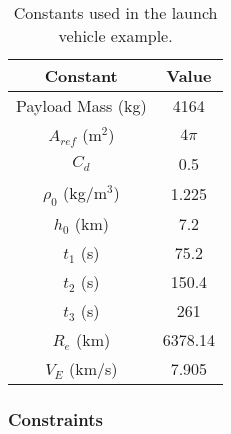 \documentclass[10pt]{article}
\begin{document}
\begin{table}[htdp]
\caption{Constants used in the launch vehicle example.}
\begin{center}
\begin{tabular}{|c|c|}
\hline
Constant & Value \\
\hline \hline
Payload Mass (kg) & 4164 \\
\hline
$A_{ref}$ (m${}^2$) & $4\pi$ \\
\hline
$C_d$ & 0.5 \\
\hline
$\rho_0$ (kg/m${}^3$)& 1.225 \\
\hline
$h_0$ (km) & 7.2\\
\hline
$t_1$ (s) & 75.2 \\
\hline
 $t_2$ (s) & 150.4 \\
\hline
 $t_3$ (s) & 261 \\
\hline
 $R_e$ (km) & 6378.14 \\
\hline
 $V_E$ (km/s) & 7.905\\
\hline
\end{tabular}
\end{center}
\label{dynamics properties}
\end{table}

\subsubsection{Constraints}
\end{document}
